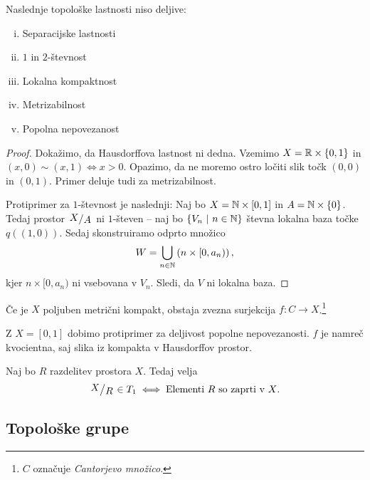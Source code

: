 \begin{trditev}
Naslednje topološke lastnosti niso deljive:

\begin{multicols}{2}
\begin{enumerate}[i)]
\item Separacijske lastnosti
\item $1$ in $2$-števnost
\item Lokalna kompaktnost
\item Metrizabilnost
\item Popolna nepovezanost
\end{enumerate}
\end{multicols}
\end{trditev}

\begin{proof}
Dokažimo, da Hausdorffova lastnost ni dedna. Vzemimo
$X = \mathbb{R} \times \left\{0, 1\right\}$ in $(x,0) \sim (x,1) \iff x > 0$.
Opazimo, da ne moremo ostro ločiti slik točk $(0,0)$ in $(0,1)$.
Primer deluje tudi za metrizabilnost.

Protiprimer za $1$-števnost je naslednji: Naj bo
$X = \mathbb{N} \times [0,1]$ in $A = \mathbb{N} \times \left\{0\right\}$. Tedaj prostor
$\kvoc{X}{A}$ ni $1$-števen -- naj bo $\left\{V_n~\middle\vert~n \in \mathbb{N}\right\}$ števna
lokalna baza točke $q((1,0))$. Sedaj skonstruiramo odprto množico
\[
W = \bigcup_{n \in \mathbb{N}} \left(n \times [0, a_n)\right),
\]
kjer $n \times [0, a_n)$ ni vsebovana v $V_n$. Sledi, da $V$ ni
lokalna baza.
\end{proof}

\begin{izrek}[Aleksandrov]
Če je $X$ poljuben metrični kompakt, obstaja zvezna surjekcija
$f \colon C \to X$.\footnote{$C$ označuje \emph{Cantorjevo
množico}.}
\end{izrek}

\begin{opomba}
Z $X = [0, 1]$ dobimo protiprimer za deljivost popolne
nepovezanosti. $f$ je namreč kvocientna, saj slika iz kompakta v
Hausdorffov prostor.
\end{opomba}

\begin{trditev}\label{td:frec}
Naj bo $R$ razdelitev prostora $X$. Tedaj velja
\[
\kvoc{X}{R} \in T_1 \iff \text{Elementi $R$ so zaprti v $X$}.
\]
\end{trditev}

\obvs

\newpage

\subsection{Topološke grupe}

